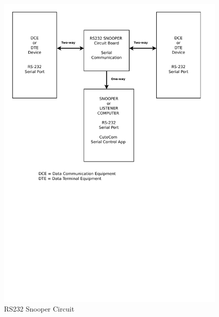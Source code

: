 \begin{figure}
	\caption{RS232 Snooper Circuit}
	\label{RS232-Snooper-Circuit.pdf}
	\includegraphics[width=1.00\textwidth]{Chap3/work-setup/RS232-Snooper-Circuit.pdf} 
\end{figure}


